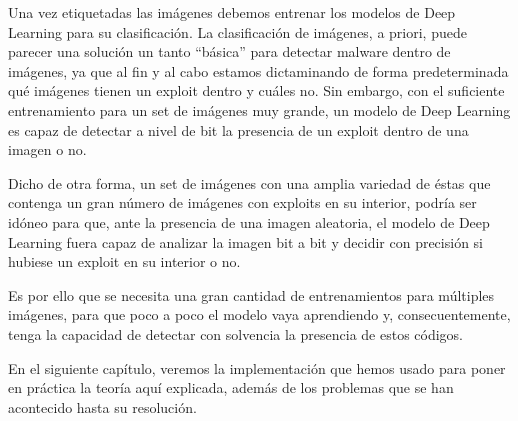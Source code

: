 Una vez etiquetadas las imágenes debemos entrenar los modelos de Deep Learning para su clasificación. La clasificación de imágenes, a priori, puede parecer una solución un tanto ``básica'' para detectar malware dentro de imágenes, ya que al fin y al cabo estamos dictaminando de forma predeterminada qué imágenes tienen un exploit dentro y cuáles no. Sin embargo, con el suficiente entrenamiento para un set de imágenes muy grande, un modelo de Deep Learning es capaz de detectar a nivel de bit la presencia de un exploit dentro de una imagen o no.

Dicho de otra forma, un set de imágenes con una amplia variedad de éstas que contenga un gran número de imágenes con exploits en su interior, podría ser idóneo para que, ante la presencia de una imagen aleatoria, el modelo de Deep Learning fuera capaz de analizar la imagen bit a bit y decidir con precisión si hubiese un exploit en su interior o no.

Es por ello que se necesita una gran cantidad de entrenamientos para múltiples imágenes, para que poco a poco el modelo vaya aprendiendo y, consecuentemente, tenga la capacidad de detectar con solvencia la presencia de estos códigos.

En el siguiente capítulo, veremos la implementación que hemos usado para poner en práctica la teoría aquí explicada, además de los problemas que se han acontecido hasta su resolución.